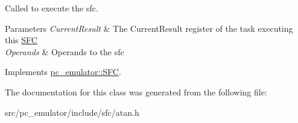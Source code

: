 Called to execute the sfc. 


\begin{DoxyParams}{Parameters}
{\em Current\+Result} & The Current\+Result register of the task executing this \hyperlink{classpc__emulator_1_1SFC}{S\+FC} \\
\hline
{\em Operands} & Operands to the sfc \\
\hline
\end{DoxyParams}


Implements \hyperlink{classpc__emulator_1_1SFC_ab206c80fc0e429c56672b4f6a0ca8635}{pc\+\_\+emulator\+::\+S\+FC}.



The documentation for this class was generated from the following file\+:\begin{DoxyCompactItemize}
\item 
src/pc\+\_\+emulator/include/sfc/atan.\+h\end{DoxyCompactItemize}
